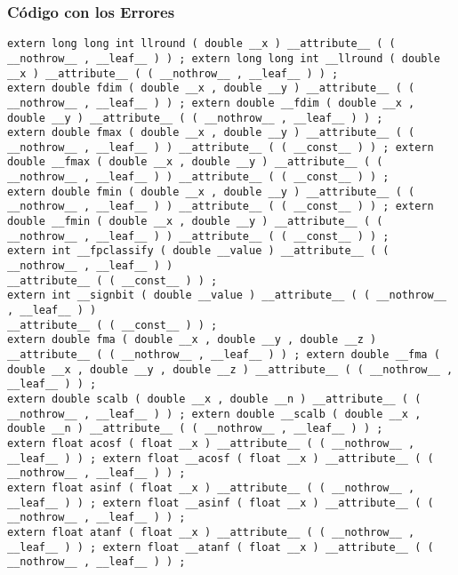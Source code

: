 \documentclass{beamer}
\begin{document}
\begin{frame}[fragile]
\frametitle{C\'odigo con los Errores}
\begin{verbatim}
extern long long int llround ( double __x ) __attribute__ ( ( __nothrow__ , __leaf__ ) ) ; extern long long int __llround ( double __x ) __attribute__ ( ( __nothrow__ , __leaf__ ) ) ; 
extern double fdim ( double __x , double __y ) __attribute__ ( ( __nothrow__ , __leaf__ ) ) ; extern double __fdim ( double __x , double __y ) __attribute__ ( ( __nothrow__ , __leaf__ ) ) ; 
extern double fmax ( double __x , double __y ) __attribute__ ( ( __nothrow__ , __leaf__ ) ) __attribute__ ( ( __const__ ) ) ; extern double __fmax ( double __x , double __y ) __attribute__ ( ( __nothrow__ , __leaf__ ) ) __attribute__ ( ( __const__ ) ) ; 
extern double fmin ( double __x , double __y ) __attribute__ ( ( __nothrow__ , __leaf__ ) ) __attribute__ ( ( __const__ ) ) ; extern double __fmin ( double __x , double __y ) __attribute__ ( ( __nothrow__ , __leaf__ ) ) __attribute__ ( ( __const__ ) ) ; 
extern int __fpclassify ( double __value ) __attribute__ ( ( __nothrow__ , __leaf__ ) ) 
__attribute__ ( ( __const__ ) ) ; 
extern int __signbit ( double __value ) __attribute__ ( ( __nothrow__ , __leaf__ ) ) 
__attribute__ ( ( __const__ ) ) ; 
extern double fma ( double __x , double __y , double __z ) __attribute__ ( ( __nothrow__ , __leaf__ ) ) ; extern double __fma ( double __x , double __y , double __z ) __attribute__ ( ( __nothrow__ , __leaf__ ) ) ; 
extern double scalb ( double __x , double __n ) __attribute__ ( ( __nothrow__ , __leaf__ ) ) ; extern double __scalb ( double __x , double __n ) __attribute__ ( ( __nothrow__ , __leaf__ ) ) ; 
extern float acosf ( float __x ) __attribute__ ( ( __nothrow__ , __leaf__ ) ) ; extern float __acosf ( float __x ) __attribute__ ( ( __nothrow__ , __leaf__ ) ) ; 
extern float asinf ( float __x ) __attribute__ ( ( __nothrow__ , __leaf__ ) ) ; extern float __asinf ( float __x ) __attribute__ ( ( __nothrow__ , __leaf__ ) ) ; 
extern float atanf ( float __x ) __attribute__ ( ( __nothrow__ , __leaf__ ) ) ; extern float __atanf ( float __x ) __attribute__ ( ( __nothrow__ , __leaf__ ) ) ; 
\end{verbatim}
\end{frame}
\end{document}
